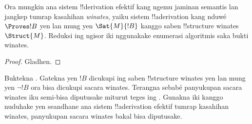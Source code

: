 \documentclass[../../../include/open-logic-section]{subfiles}
\begin{document}
\begin{cor}%
  Ora mungkin ana sistem !!{derivation} efektif kang ngemu
  jaminan semantis lan jangkep tumrap kasahihan
  \emph{winates}, yaiku
  sistem !!a{derivation} kang nduwé $\Proves !B$
  yen lan mung yen $\Sat{M}{!B}$ kanggo saben
  !!{structure} winates~$\Struct{M}$. Reduksi ing ngisor iki nggunakake enumerasi algoritmis saka bukti winates.
\end{cor}

\begin{proof}
  Gladhen.
\end{proof}

\begin{prob}
  Buktekna .
  Gatekna yen $!B$ dicukupi ing saben
  !!{structure} winates yen lan mung yen
  $\lnot !B$ ora bisa dicukupi sacara winates.
  Terangna sebabé panyukupan sacara winates
  iku semi-bisa diputusake miturut teges ing
  . Gunakna
  iki kanggo nuduhake yen seandhane ana
  sistem !!a{derivation} efektif tumrap kasahihan winates,
  panyukupan sacara winates bakal bisa diputusake.
\end{prob}
\end{document}
